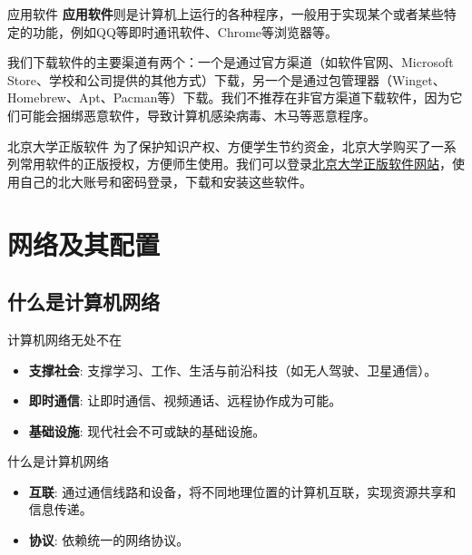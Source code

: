 \documentclass{beamer}
\begin{document}
\begin{frame}{应用软件}
    \textbf{应用软件}则是计算机上运行的各种程序，一般用于实现某个或者某些特定的功能，例如QQ等即时通讯软件、Chrome等浏览器等。

    我们下载软件的主要渠道有两个：一个是通过官方渠道（如软件官网、Microsoft Store、学校和公司提供的其他方式）下载，另一个是通过包管理器（Winget、Homebrew、Apt、Pacman等）下载。我们不推荐在非官方渠道下载软件，因为它们可能会捆绑恶意软件，导致计算机感染病毒、木马等恶意程序。
\end{frame}

\begin{frame}{北京大学正版软件}
    为了保护知识产权、方便学生节约资金，北京大学购买了一系列常用软件的正版授权，方便师生使用。我们可以登录\href{https://software.pku.edu.cn/}{北京大学正版软件网站}，使用自己的北大账号和密码登录，下载和安装这些软件。
\end{frame}

\section{网络及其配置}


\subsection{什么是计算机网络}

\begin{frame}{计算机网络无处不在}
\begin{itemize}
    \item \textbf{支撑社会}: 支撑学习、工作、生活与前沿科技（如无人驾驶、卫星通信）。
    \item \textbf{即时通信}: 让即时通信、视频通话、远程协作成为可能。
    \item \textbf{基础设施}: 现代社会不可或缺的基础设施。
\end{itemize}
\end{frame}

\begin{frame}{什么是计算机网络}
\begin{itemize}
    \item \textbf{互联}: 通过通信线路和设备，将不同地理位置的计算机互联，实现资源共享和信息传递。
    \item \textbf{协议}: 依赖统一的网络协议。
\end{itemize}
\end{frame}
\end{document}

